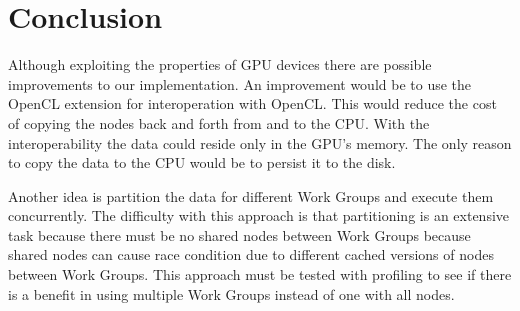 \documentclass[11pt,a4paper]{scrartcl}
\begin{document}
\section{Conclusion}
Although exploiting the properties of GPU devices there are possible improvements to our implementation.
An improvement would be to use the OpenCL extension for interoperation with OpenCL. This would reduce the cost of copying the nodes back and forth from and to the CPU. With the interoperability the data could reside only in the GPU's memory. The only reason to copy the data to the CPU would be to persist it to the disk.

Another idea is partition the data for different Work Groups and execute them concurrently. The difficulty with this approach is that partitioning is an extensive task because there must be no shared nodes between Work Groups because shared nodes can cause race condition due to different cached versions of nodes between Work Groups. This approach must be tested with profiling to see if there is a benefit in using multiple Work Groups instead of one with all nodes.
\end{document}
